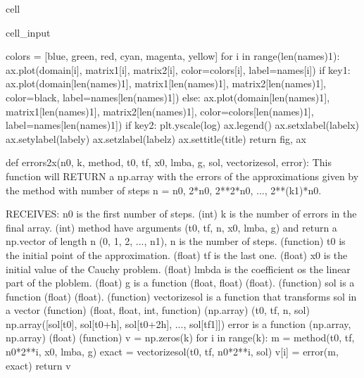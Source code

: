 \documentclass[letterpaper,10pt,english]{jupyterBook}
\begin{document}
\begin{sphinxuseclass}{cell}
\begin{sphinxVerbatimInput}
\begin{sphinxuseclass}{cell_input}
\begin{sphinxVerbatim}[commandchars=\\\{\}]
  colors = [\PYGZsq{}blue\PYGZsq{}, \PYGZsq{}green\PYGZsq{}, \PYGZsq{}red\PYGZsq{}, \PYGZsq{}cyan\PYGZsq{}, \PYGZsq{}magenta\PYGZsq{}, \PYGZsq{}yellow\PYGZsq{}]
  for i in range(len(names)\PYGZhy{}1):
    ax.plot(domain[i], matrix1[i], matrix2[i], color=colors[i], label=names[i])
  if key1:
    ax.plot(domain[len(names)\PYGZhy{}1], matrix1[len(names)\PYGZhy{}1], matrix2[len(names)\PYGZhy{}1], color=\PYGZsq{}black\PYGZsq{}, label=names[len(names)\PYGZhy{}1])
  else:
    ax.plot(domain[len(names)\PYGZhy{}1], matrix1[len(names)\PYGZhy{}1], matrix2[len(names)\PYGZhy{}1], color=colors[len(names)\PYGZhy{}1], label=names[len(names)\PYGZhy{}1])
  if key2:
    plt.yscale(\PYGZsq{}log\PYGZsq{})
  ax.legend()
  ax.set\PYGZus{}xlabel(labelx)
  ax.set\PYGZus{}ylabel(labely)
  ax.set\PYGZus{}zlabel(labelz)
  ax.set\PYGZus{}title(title)
  return fig, ax

def errors\PYGZus{}2x(n0, k, method, t0, tf, x0, lmba, g, sol, vectorize\PYGZus{}sol, error):
  \PYGZsq{}\PYGZsq{}\PYGZsq{}
  This function will RETURN a np.array with the errors of the approximations given
  by the method with number of steps n = n0, 2*n0, 2**2*n0, ..., 2**(k\PYGZhy{}1)*n0.

  RECEIVES:
  n0 is the first number of steps. (int)
  k is the number of errors in the final array. (int)
  method have arguments (t0, tf, n, x0, lmba, g) and return a
  np.vector of length n (0, 1, 2, ..., n\PYGZhy{}1), n is the number of steps. (function)
  t0 is the initial point of the approximation. (float)
  tf is the last one. (float)
  x0 is the initial value of the Cauchy problem. (float)
  lmbda is the coefficient os the linear part of the ploblem. (float)
  g is a function (float, float) \PYGZhy{}\PYGZgt{} (float). (function)
  sol is a function (float) \PYGZhy{}\PYGZgt{} (float). (function)
  vectorize\PYGZus{}sol is a function that \PYGZdq{}transforms sol in a vector\PYGZdq{} (function)
  (float, float, int, function) \PYGZhy{}\PYGZgt{} (np.array)
  (t0, tf, n, sol) \PYGZhy{}\PYGZgt{} np.array([sol[t0], sol[t0+h], sol[t0+2h], ..., sol[tf\PYGZhy{}1]])
  error is a function (np.array, np.array) \PYGZhy{}\PYGZgt{} (float) (function)
  \PYGZsq{}\PYGZsq{}\PYGZsq{}
  v = np.zeros(k)
  for i in range(k):
    m = method(t0, tf, n0*2**i, x0, lmba, g)
    exact = vectorize\PYGZus{}sol(t0, tf, n0*2**i, sol)
    v[i] = error(m, exact)
  return v


\end{sphinxVerbatim}
\end{sphinxuseclass}
\end{sphinxVerbatimInput}
\end{sphinxuseclass}
\end{document}
